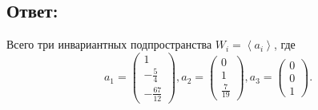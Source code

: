 \documentclass[12pt]{article}
\begin{document}
    \subsection*{Ответ:}
    Всего три инвариантных подпространства $W_i = \left < a_i \right >$, где
    \[
        a_1 = \begin{pmatrix}
                  1 \\ - \frac{5}{4} \\ - \frac{67}{12}
        \end{pmatrix} ,
        a_2 = \begin{pmatrix}
                  0 \\ 1 \\ \frac{7}{19}
        \end{pmatrix} ,
        a_3 = \begin{pmatrix}
                  0 \\ 0 \\ 1
        \end{pmatrix} .
    \]
\end{document}

